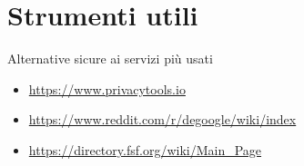 



\subtitle{Parte 2 - Il mantello dell'invisibilità}
\date{TODO 2022}
\maketitle







\section{Strumenti utili}
\begin{myframe}{Alternative sicure ai servizi più usati}
  \begin{itemize}
    \item \url{https://www.privacytools.io}
    \item \url{https://www.reddit.com/r/degoogle/wiki/index}
    \item \url{https://directory.fsf.org/wiki/Main_Page}
  \end{itemize}
\end{myframe}


